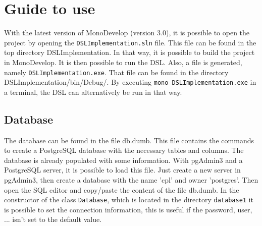 
\section{Guide to use}
With the latest version of MonoDevelop (version 3.0), it is possible to open the project by opening the \texttt{DSLImplementation.sln} file. This file can be found in the top directory DSLImplementation. In that way, it is possible to build the project in MonoDevelop. It is then possible to run the DSL. Also, a file is generated, namely \texttt{DSLImplementation.exe}. That file can be found in the directory DSLImplementation/bin/Debug/. By executing \texttt{mono DSLImplementation.exe} in a terminal, the DSL can alternatively be run in that way.

\subsection{Database}
The database can be found in the file db.dumb. This file contains the commands to create a PostgreSQL database with the necessary tables and columns. The database is already populated with some information. With pgAdmin3 and a PostgreSQL server, it is possible to load this file. Just create a new server in pgAdmin3, then create a database with the name 'cpl' and owner 'postgres'. Then open the SQL editor and copy/paste the content of the file db.dumb. In the constructor of the class \texttt{Database}, which is located in the directory \texttt{database1} it is possible to set the connection information, this is useful if the password, user, ... isn't set to the default value.